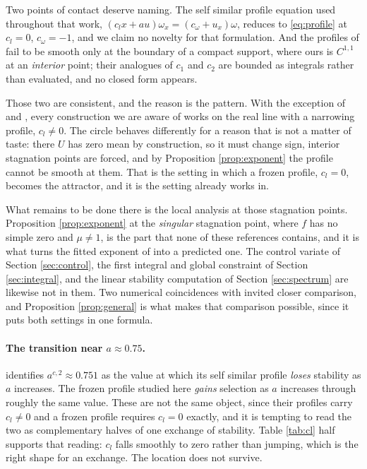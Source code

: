 \documentclass[11pt]{article}
\theoremstyle{definition}
\begin{document}
Two points of contact deserve naming. The self similar profile equation used
throughout that work, $(c_l x + a u)\omega_x = (c_\omega + u_x)\omega$, reduces
to \eqref{eq:profile} at $c_l = 0$, $c_\omega = -1$, and we claim no novelty for
that formulation. And the profiles of \cite{hqww2023} fail to be smooth only at
the boundary of a compact support, where ours is $C^{1,1}$ at an \emph{interior}
point; their analogues of $c_1$ and $c_2$ are bounded as integrals rather than
evaluated, and no closed form appears.

Those two are consistent, and the reason is the pattern. With the exception of
\cite{lss2020} and \cite{slsa2025}, every construction we are aware of works on
the real line with a narrowing profile, $c_l\ne0$. The circle behaves
differently for a reason that is not a matter of taste: there $U$ has zero mean
by construction, so it must change sign, interior stagnation points are forced,
and by Proposition \ref{prop:exponent} the profile cannot be smooth at them.
That is the setting in which a frozen profile, $c_l=0$, becomes the attractor,
and it is the setting \cite{lss2020} already works in.

What remains to be done there is the local analysis at those stagnation points.
Proposition \ref{prop:exponent} at the \emph{singular} stagnation point, where
$f$ has no simple zero and $\mu\ne1$, is the part that none of these references
contains, and it is what turns the fitted exponent of \cite{lss2020} into a
predicted one. The control variate of Section \ref{sec:control}, the first
integral and global constraint of Section \ref{sec:integral}, and the linear
stability computation of Section \ref{sec:spectrum} are likewise not in them.
Two numerical coincidences with \cite{htw2026} invited closer comparison, and
Proposition \ref{prop:general} is what makes that comparison possible, since it
puts both settings in one formula.

\paragraph{The transition near $a\approx 0.75$.} \cite{htw2026} identifies
$a^{c,2}\approx 0.751$ as the value at which its self similar profile
\emph{loses} stability as $a$ increases. The frozen profile studied here
\emph{gains} selection as $a$ increases through roughly the same value. These
are not the same object, since their profiles carry $c_l \ne 0$ and a frozen
profile requires $c_l=0$ exactly, and it is tempting to read the two as
complementary halves of one exchange of stability. Table \ref{tab:cl} half
supports that reading: $c_l$ falls smoothly to zero rather than jumping, which
is the right shape for an exchange. The location does not survive.
\end{document}
